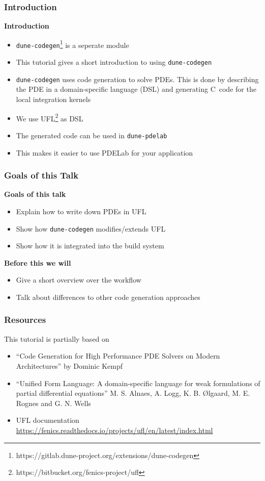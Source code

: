\documentclass[aspectratio=169,11pt]{beamer}
\theoremstyle{definition}
\def\CC{{C\nolinebreak[4]\hspace{-.05em}\raisebox{.4ex}{\tiny\bf ++}}}
\begin{document}
\begin{frame}[fragile]
  \frametitle{Introduction}
  \textbf{Introduction}
  \begin{itemize}
    \item \lstinline{dune-codegen}\footnote{https://gitlab.dune-project.org/extensions/dune-codegen} is a seperate module
  \item This tutorial gives a short introduction to using
    \lstinline{dune-codegen}
  \item \lstinline{dune-codegen} uses code generation to solve PDEs. This is
    done by describing the PDE in a domain-specific language (DSL) and
    generating \CC\ code for the local integration kernels
  \item We use UFL\footnote{https://bitbucket.org/fenics-project/ufl} as DSL
  \item The generated code can be used in \lstinline{dune-pdelab}
  \item This makes it easier to use PDELab for your application
  \end{itemize}
\end{frame}

\begin{frame}
  \frametitle{Goals of this Talk}

  \textbf{Goals of this talk}
  \begin{itemize}
  \item Explain how to write down PDEs in UFL
  \item Show how \lstinline{dune-codegen} modifies/extends UFL
  \item Show how it is integrated into the build system
  \end{itemize}
  \vfill
  \textbf{Before this we will}
  \begin{itemize}
  \item Give a short overview over the workflow
  \item Talk about differences to other code generation approaches
  \end{itemize}
\end{frame}

\begin{frame}
  \frametitle{Resources}
  This tutorial is partially based on
  \begin{itemize}
  \item ``Code Generation for High Performance PDE Solvers
    on Modern Architectures'' by Dominic Kempf
  \item ``Unified Form Language: A domain-specific language for weak
    formulations of partial differential equations'' M. S. Alnaes, A. Logg,
    K. B. Ølgaard, M. E. Rognes and G. N. Wells
  \item UFL documentation
    \url{https://fenics.readthedocs.io/projects/ufl/en/latest/index.html}
  \end{itemize}

\end{frame}
\end{document}
